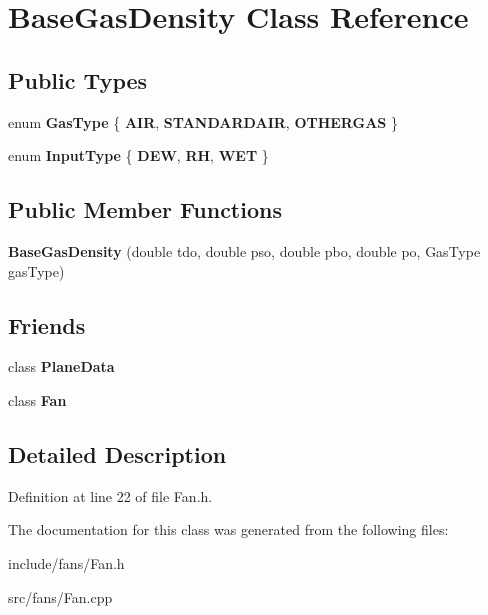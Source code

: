 \hypertarget{class_base_gas_density}{}\section{Base\+Gas\+Density Class Reference}
\label{class_base_gas_density}
\subsection*{Public Types}
\begin{DoxyCompactItemize}
\item 
\mbox{\label{class_base_gas_density_afb215e48f6193462521b7e8d47306ed3}} 
enum {\bfseries Gas\+Type} \{ {\bfseries A\+IR}, 
{\bfseries S\+T\+A\+N\+D\+A\+R\+D\+A\+IR}, 
{\bfseries O\+T\+H\+E\+R\+G\+AS}
 \}
\item 
\mbox{\label{class_base_gas_density_a54f846cc4683a49d3904a40fe2986772}} 
enum {\bfseries Input\+Type} \{ {\bfseries D\+EW}, 
{\bfseries RH}, 
{\bfseries W\+ET}
 \}
\end{DoxyCompactItemize}
\subsection*{Public Member Functions}
\begin{DoxyCompactItemize}
\item 
\mbox{\label{class_base_gas_density_a693fb58303fb2077aa5082b8f14dec84}} 
{\bfseries Base\+Gas\+Density} (double tdo, double pso, double pbo, double po, Gas\+Type gas\+Type)
\end{DoxyCompactItemize}
\subsection*{Friends}
\begin{DoxyCompactItemize}
\item 
\mbox{\label{class_base_gas_density_a28ff438eefb65e97bddb4051dd0a0112}} 
class {\bfseries Plane\+Data}
\item 
\mbox{\label{class_base_gas_density_a0a305abd4183ca4b5d3adb1b563378d7}} 
class {\bfseries Fan}
\end{DoxyCompactItemize}


\subsection{Detailed Description}


Definition at line 22 of file Fan.\+h.



The documentation for this class was generated from the following files\+:\begin{DoxyCompactItemize}
\item 
include/fans/Fan.\+h\item 
src/fans/Fan.\+cpp\end{DoxyCompactItemize}
